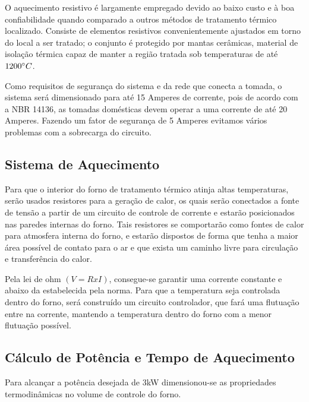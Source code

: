 O aquecimento resistivo é largamente empregado devido ao baixo custo e à boa confiabilidade quando comparado a outros métodos de tratamento térmico localizado. Consiste de elementos resistivos convenientemente ajustados em torno do local a ser tratado; o conjunto é protegido por mantas cerâmicas, material de isolação térmica capaz de manter a região tratada sob temperaturas de até $1200\degree C$.

Como requisitos de segurança do sistema e da rede que conecta a tomada, o sistema será dimensionado para até 15 Amperes de corrente, pois de acordo com a NBR 14136, as tomadas domésticas devem operar a uma corrente de até 20 Amperes. Fazendo um fator de segurança de 5 Amperes evitamos vários problemas com a sobrecarga do circuito.

\subsection{Sistema de Aquecimento}

Para que o interior do forno de tratamento térmico atinja altas temperaturas, serão usados resistores para a geração de calor, os quais serão conectados a fonte de tensão a partir de um circuito de controle de corrente e estarão posicionados nas paredes internas do forno. Tais resistores se comportarão como fontes de calor para atmosfera interna do forno, e estarão dispostos de forma que tenha a maior área possível de contato para o ar e que exista um caminho livre para circulação e transferência do calor.

Pela lei de ohm $(V=R x I)$, consegue-se garantir uma corrente constante e abaixo da estabelecida pela norma. Para que a temperatura seja controlada dentro do forno, será construído um circuito controlador, que fará uma flutuação entre na corrente, mantendo a temperatura dentro do forno com a menor flutuação possível.

\subsection{Cálculo de Potência e Tempo de Aquecimento}

Para alcançar a potência desejada de 3kW dimensionou-se as propriedades termodinâmicas no volume de controle do forno.

